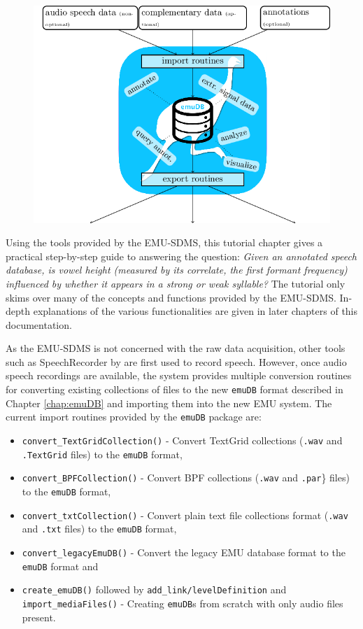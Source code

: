 \documentclass[]{book}
\providecommand{\tightlist}{%
  \setlength{\itemsep}{0pt}\setlength{\parskip}{0pt}}
\theoremstyle{definition}
\theoremstyle{definition}
\theoremstyle{definition}
\theoremstyle{remark}
\begin{document}
\begin{figure}
\centering
\includegraphics{pics/emuSdmsBirdsEye.png}
\caption{}
\end{figure}

Using the tools provided by the EMU-SDMS, this tutorial chapter gives a
practical step-by-step guide to answering the question: \emph{Given an
annotated speech database, is vowel height (measured by its correlate,
the first formant frequency) influenced by whether it appears in a
strong or weak syllable?} The tutorial only skims over many of the
concepts and functions provided by the EMU-SDMS. In-depth explanations
of the various functionalities are given in later chapters of this
documentation.

As the EMU-SDMS is not concerned with the raw data acquisition, other
tools such as SpeechRecorder by \citet{draxler:2004a} are first used to
record speech. However, once audio speech recordings are available, the
system provides multiple conversion routines for converting existing
collections of files to the new \texttt{emuDB} format described in
Chapter \ref{chap:emuDB} and importing them into the new EMU system. The
current import routines provided by the \texttt{emuDB} package are:

\begin{itemize}
\tightlist
\item
  \texttt{convert\_TextGridCollection()} - Convert TextGrid collections
  (\texttt{.wav} and \texttt{.TextGrid} files) to the \texttt{emuDB}
  format,
\item
  \texttt{convert\_BPFCollection()} - Convert BPF collections
  (\texttt{.wav} and \texttt{.par}\} files) to the \texttt{emuDB}
  format,
\item
  \texttt{convert\_txtCollection()} - Convert plain text file
  collections format (\texttt{.wav} and \texttt{.txt} files) to the
  \texttt{emuDB} format,
\item
  \texttt{convert\_legacyEmuDB()} - Convert the legacy EMU database
  format to the \texttt{emuDB} format and
\item
  \texttt{create\_emuDB()} followed by
  \texttt{add\_link/levelDefinition} and \texttt{import\_mediaFiles()} -
  Creating \texttt{emuDB}s from scratch with only audio files present.
\end{itemize}
\end{document}
